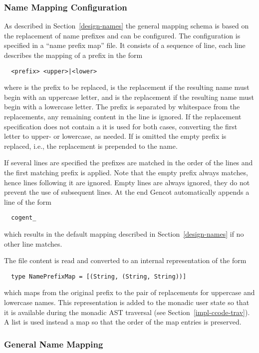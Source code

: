 \subsubsection{Name Mapping Configuration}

As described in Section~\ref{design-names} the general mapping schema is based on the replacement of 
name prefixes and can be configured. The configuration is specified in a ``name prefix map'' file.
It consists of a sequence of line, each line describes the mapping of a prefix in the form
\begin{verbatim}
  <prefix> <upper>|<lower>
\end{verbatim}
where  is the prefix to be replaced,  is the replacement if the resulting 
name must begin with an uppercase letter, and  is the replacement if the resulting name 
must begin with a lowercase letter. The prefix is separated by whitespace from the replacements, any remaining content 
in the line is ignored. If the replacement specification does not contain a  it is used for
both cases, converting the first letter to upper- or lowercase, as needed. If  is omitted
the empty prefix is replaced, i.e., the replacement is prepended to the name. 

If several lines are specified the prefixes are matched in the order of the lines and the first matching
prefix is applied. Note that the empty prefix always matches, hence lines following it are ignored.
Empty lines are always ignored, they do not prevent the use of subsequent lines.
At the end Gencot automatically appends a line of the form
\begin{verbatim}
  cogent_
\end{verbatim}
which results in the default mapping described in Section~\ref{design-names} if no other line matches.

The file content is read and converted to an internal representation of the form 
\begin{verbatim}
  type NamePrefixMap = [(String, (String, String))]
\end{verbatim}
which maps from the original prefix to the pair of replacements for uppercase and lowercase names.
This representation is added to the monadic user state so that it is available during the monadic AST traversal
(see Section~\ref{impl-ccode-trav}). A list is used instead a map so that the order of the map entries
is preserved.

\subsubsection{General Name Mapping}

